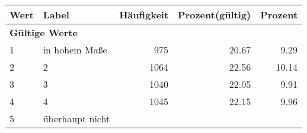      \begin{longtable}{lXrrr}
     \toprule
     \textbf{Wert} & \textbf{Label} & \textbf{Häufigkeit} & \textbf{Prozent(gültig)} & \textbf{Prozent} \\
     \endhead
     \midrule
     \multicolumn{5}{l}{\textbf{Gültige Werte}}\\

     1 &
     \multicolumn{1}{X}{ in hohem Maße   } &


       \num{975} &
       \num[round-mode=places,round-precision=2]{20,67} &
         \num[round-mode=places,round-precision=2]{9,29} \\

     2 &
     \multicolumn{1}{X}{ 2   } &


       \num{1064} &
       \num[round-mode=places,round-precision=2]{22,56} &
         \num[round-mode=places,round-precision=2]{10,14} \\

     3 &
     \multicolumn{1}{X}{ 3   } &


       \num{1040} &
       \num[round-mode=places,round-precision=2]{22,05} &
         \num[round-mode=places,round-precision=2]{9,91} \\

     4 &
     \multicolumn{1}{X}{ 4   } &


       \num{1045} &
       \num[round-mode=places,round-precision=2]{22,15} &
         \num[round-mode=places,round-precision=2]{9,96} \\

     5 &
     \multicolumn{1}{X}{ überhaupt nicht   } &



\end{longtable}
